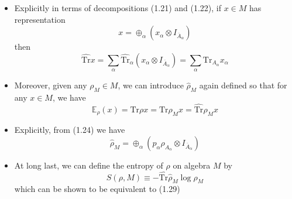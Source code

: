 \documentclass[12pt,a4paper]{article}
\numberwithin{equation}{section}
\newcommand{\ntr}{\hat{\text{Tr}}}
\theoremstyle{definition}
\theoremstyle{theorem}
\begin{document}
\begin{itemize}
		\item Explicitly in terms of decompositions (1.21) and (1.22), if $x\in M$ has representation
		\begin{equation}
			x=\oplus_{\alpha}\left(x_{\alpha}\otimes I_{\overline{A}_{\alpha}}\right)
		\end{equation}
		then
		\begin{equation}
			\ntr{x}=\sum_{\alpha}\ntr_{\alpha}\left(x_{\alpha}\otimes I_{\overline{A}_{\alpha}}\right)=\sum_{\alpha}\text{Tr}_{A_{\alpha}}x_{\alpha}
		\end{equation}
		\item Moreover, given any $\rho_{M}\in M$, we can introduce $\hat{\rho}_{M}$ again defined so that for any $x\in M$, we have
		\begin{equation}
			\mathbb{E}_{\rho}(x)=\text{Tr}\rho x=\text{Tr}\rho_{M}x=\ntr\hat{\rho}_{M}x
		\end{equation}
		\item Explicitly, from (1.24) we have
		\begin{equation}
			\hat{\rho}_{M}=\oplus_{\alpha}\left(p_{\alpha}\rho_{A_{\alpha}}\otimes I_{\overline{A}_{\alpha}}\right)
		\end{equation}
		\item At long last, we can define the entropy of $\rho$ on algebra $M$ by
		\begin{equation}
			S(\rho,M)\equiv-\ntr\hat{\rho}_{M}\log\hat{\rho}_{M}
		\end{equation}
		which can be shown to be equivalent to (1.29)
	\end{itemize}
\end{document}
